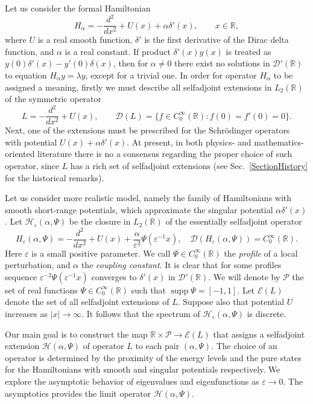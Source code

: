 \documentclass[11pt,english]{amsart}
\begin{document}
Let us consider the formal Hamiltonian
$$H_\alpha=-\frac{d^2}{dx^2}+U(x)+\alpha\delta'(x),\qquad x\in\mathbb R,$$
where $U$ is a real smooth function, $\delta'$ is the first derivative of the Dirac delta function, and $\alpha$ is a real constant. If product $\delta'(x)y(x)$ is treated as  $y(0)\delta'(x)-y'(0)\delta(x)$, then for $\alpha\neq 0$ there exist no solutions in $\mathcal{D}'(\mathbb{R})$ to equation $H_\alpha y=\lambda y$, except for a trivial one.
In order for operator  $H_\alpha$ to be assigned a meaning, firstly we must describe all selfadjoint extensions in
 $L_2(\mathbb{R})$  of the symmetric operator
\begin{equation*}
    L=-\frac{d^2}{dx^2}+U(x),\qquad \mathcal{D}(L)=\{f\in C_0^\infty(\mathbb{R})\colon f(0)=f'(0)=0\}.
\end{equation*}
Next, one of the extensions must be prescribed for the Schr\"{o}dinger operators with potential
$U(x)+\alpha\delta'(x)$.
At present, in both physics- and mathematics-oriented literature there is no a consensus regarding
the pro\-per choice of such operator, since  $L$ has a rich set of selfadjoint extensions (see Sec.~\ref{SectionHistory} for the historical remarks).

Let us consider more realistic model, namely the family of Hamiltonians with smooth short-range potentials, which
approximate the singular potential $\alpha\delta'(x)$. Let
$\mathcal{H}_{\varepsilon}(\alpha,\Psi)$ be the closure in  $L_2(\mathbb{R})$ of the essentially selfadjoint operator \cite[p. 50]{BS}
\begin{equation*}
    H_{\varepsilon}(\alpha, \Psi)=-\frac{d^2}{dx^2}+U(x)+\frac{\alpha}{\varepsilon^{2}}\Psi(\varepsilon^{-1}x), \quad
\mathcal{D}(H_{\varepsilon}(\alpha, \Psi))=C_0^\infty(\mathbb{R}).
\end{equation*}
Here $\varepsilon$ is a small positive parameter. We call $\Psi\in C^\infty_0(\mathbb{R})$ the \emph{profile} of a local perturbation, and  $\alpha$ the \emph{coupling constant}. It is clear that for some profiles  sequence
${\varepsilon^{-2}}\Psi(\varepsilon^{-1}x)$ converges to $\delta'(x)$ in $\mathcal{D}'(\mathbb{R})$.
We will denote by $\mathcal{P}$ the set of real functions $\Psi\in C^\infty_0(\mathbb{R})$ such that $\operatorname{supp}{\Psi}=[-1,1]$. Let $\mathcal{E}(L)$ denote the set of all selfadjoint extensions of $L$.
Suppose also that  potential $U$ increases as $|x|\to \infty$. It follows that the spectrum of $\mathcal{H}_{\varepsilon}(\alpha,\Psi)$ is discrete.

Our main goal is to construct the map $\mathbb R\times
\mathcal{P}\longrightarrow \mathcal{E}(L)$ that assigns a selfadjoint extension  $\mathcal{H}(\alpha,\Psi)$ of operator $L$ to each pair $(\alpha,\Psi)$. The choice of an operator is determined by the proximity
of the energy levels and the pure states for the Hamiltonians with smooth and singular potentials respectively.
We explore the asymptotic behavior of eigenvalues and eigenfunctions as $\varepsilon\to 0$. The asymptotics provides the limit operator  $\mathcal{H}(\alpha,\Psi)$.
\end{document}
